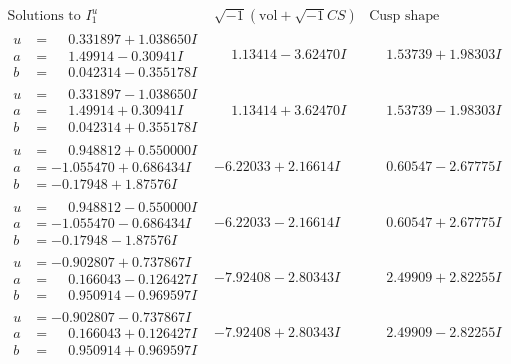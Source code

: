 \documentclass[1p]{elsarticle_modified}
\theoremstyle{definition}
\newcommand{\I}{\sqrt{-1}}
\begin{document}
$$\begin{array}{c|c|c}  
\text{Solutions to }I^u_{1}& \I (\text{vol} + \sqrt{-1}CS) & \text{Cusp shape}\\
 \hline 
\begin{aligned}
u &= \phantom{-}0.331897 + 1.038650 I \\
a &= \phantom{-}1.49914 - 0.30941 I \\
b &= \phantom{-}0.042314 - 0.355178 I\end{aligned}
 & \phantom{-}1.13414 - 3.62470 I & \phantom{-}1.53739 + 1.98303 I \\ \hline\begin{aligned}
u &= \phantom{-}0.331897 - 1.038650 I \\
a &= \phantom{-}1.49914 + 0.30941 I \\
b &= \phantom{-}0.042314 + 0.355178 I\end{aligned}
 & \phantom{-}1.13414 + 3.62470 I & \phantom{-}1.53739 - 1.98303 I \\ \hline\begin{aligned}
u &= \phantom{-}0.948812 + 0.550000 I \\
a &= -1.055470 + 0.686434 I \\
b &= -0.17948 + 1.87576 I\end{aligned}
 & -6.22033 + 2.16614 I & \phantom{-}0.60547 - 2.67775 I \\ \hline\begin{aligned}
u &= \phantom{-}0.948812 - 0.550000 I \\
a &= -1.055470 - 0.686434 I \\
b &= -0.17948 - 1.87576 I\end{aligned}
 & -6.22033 - 2.16614 I & \phantom{-}0.60547 + 2.67775 I \\ \hline\begin{aligned}
u &= -0.902807 + 0.737867 I \\
a &= \phantom{-}0.166043 - 0.126427 I \\
b &= \phantom{-}0.950914 - 0.969597 I\end{aligned}
 & -7.92408 - 2.80343 I & \phantom{-}2.49909 + 2.82255 I \\ \hline\begin{aligned}
u &= -0.902807 - 0.737867 I \\
a &= \phantom{-}0.166043 + 0.126427 I \\
b &= \phantom{-}0.950914 + 0.969597 I\end{aligned}
 & -7.92408 + 2.80343 I & \phantom{-}2.49909 - 2.82255 I \\ \hline\begin{aligned}

\end{aligned}
\end{array}$$
\end{document}
